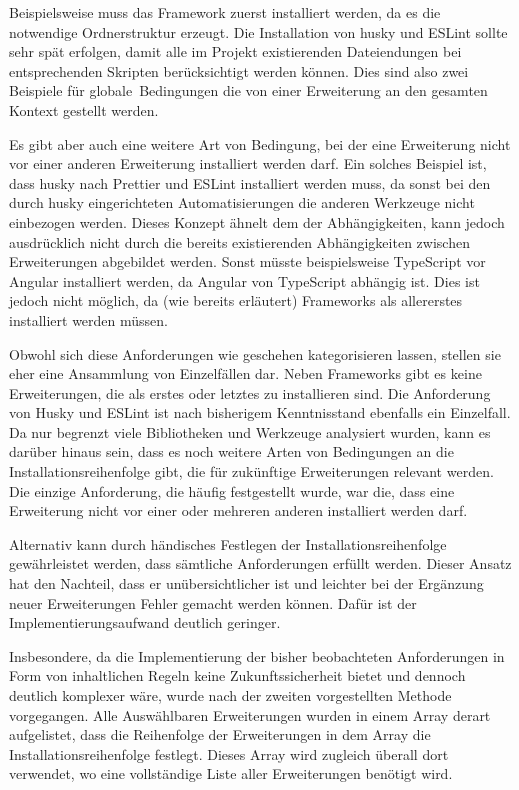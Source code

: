 Beispielsweise muss das Framework zuerst installiert werden, da es die notwendige Ordnerstruktur erzeugt. Die Installation von husky und ESLint sollte sehr spät erfolgen, damit alle im Projekt existierenden Dateiendungen bei entsprechenden Skripten berücksichtigt werden können. Dies sind also zwei Beispiele für \glqq globale\grqq\ Bedingungen die von einer Erweiterung an den gesamten Kontext gestellt werden.

Es gibt aber auch eine weitere Art von Bedingung, bei der eine Erweiterung nicht vor einer anderen Erweiterung installiert werden darf. Ein solches Beispiel ist, dass husky nach Prettier und ESLint installiert werden muss, da sonst bei den durch husky eingerichteten Automatisierungen die anderen Werkzeuge nicht einbezogen werden. Dieses Konzept ähnelt dem der Abhängigkeiten, kann jedoch ausdrücklich nicht durch die bereits existierenden Abhängigkeiten zwischen Erweiterungen abgebildet werden. Sonst müsste beispielsweise TypeScript vor Angular installiert werden, da Angular von TypeScript abhängig ist. Dies ist jedoch nicht möglich, da (wie bereits erläutert) Frameworks als allererstes installiert werden müssen.

Obwohl sich diese Anforderungen wie geschehen kategorisieren lassen, stellen sie eher eine Ansammlung von Einzelfällen dar. Neben Frameworks gibt es keine Erweiterungen, die als erstes oder letztes zu installieren sind. Die Anforderung von Husky und ESLint ist nach bisherigem Kenntnisstand ebenfalls ein Einzelfall. Da nur begrenzt viele Bibliotheken und Werkzeuge analysiert wurden, kann es darüber hinaus sein, dass es noch weitere Arten von Bedingungen an die Installationsreihenfolge gibt, die für zukünftige Erweiterungen relevant werden. Die einzige Anforderung, die häufig festgestellt wurde, war die, dass eine Erweiterung nicht vor einer oder mehreren anderen installiert werden darf.

Alternativ kann durch händisches Festlegen der Installationsreihenfolge gewährleistet werden, dass sämtliche Anforderungen erfüllt werden. Dieser Ansatz hat den Nachteil, dass er unübersichtlicher ist und leichter bei der Ergänzung neuer Erweiterungen Fehler gemacht werden können. Dafür ist der Implementierungsaufwand deutlich geringer.

Insbesondere, da die Implementierung der bisher beobachteten Anforderungen in Form von inhaltlichen Regeln keine Zukunftssicherheit bietet und dennoch deutlich komplexer wäre, wurde nach der zweiten vorgestellten Methode vorgegangen. Alle Auswählbaren Erweiterungen wurden in einem Array derart aufgelistet, dass die Reihenfolge der Erweiterungen in dem Array die Installationsreihenfolge festlegt. Dieses Array wird zugleich überall dort verwendet, wo eine vollständige Liste aller Erweiterungen benötigt wird.

